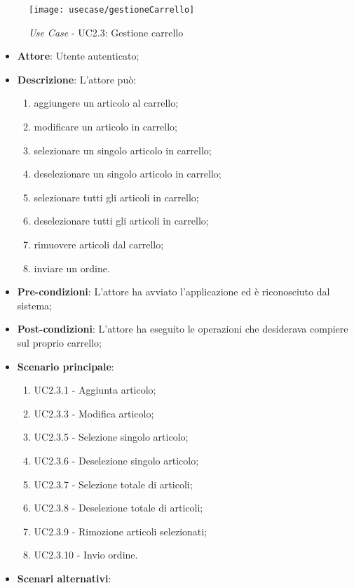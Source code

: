 \begin{figure}[!h] 
    \centering 
    \texttt{[image: usecase/gestioneCarrello]} 
    \caption{\textit{Use Case} - UC2.3: Gestione carrello}
\end{figure}

\begin{itemize}
	\item \textbf{Attore}: Utente autenticato;
	\item \textbf{Descrizione}: L'attore può:
		\begin{enumerate}
			\item aggiungere un articolo al carrello;
			\item modificare un articolo in carrello;
			\item selezionare un singolo articolo in carrello;
			\item deselezionare un singolo articolo in carrello;
			\item selezionare tutti gli articoli in carrello;
			\item deselezionare tutti gli articoli in carrello;
			\item rimuovere articoli dal carrello;
			\item inviare un ordine.
		\end{enumerate}
	\item \textbf{Pre-condizioni}: L'attore ha avviato l'applicazione ed è riconosciuto dal sistema;
	\item \textbf{Post-condizioni}: L'attore ha eseguito le operazioni che desiderava compiere sul proprio carrello;
	\item \textbf{Scenario principale}:
		\begin{enumerate}
			\item UC2.3.1 - Aggiunta articolo;
			\item UC2.3.3 - Modifica articolo;
			\item UC2.3.5 - Selezione singolo articolo;
			\item UC2.3.6 - Deselezione singolo articolo;
			\item UC2.3.7 - Selezione totale di articoli;
			\item UC2.3.8 - Deselezione totale di articoli;
			\item UC2.3.9 - Rimozione articoli selezionati;
			\item UC2.3.10 - Invio ordine.
		\end{enumerate}
	\item \textbf{Scenari alternativi}:
		\begin{itemize}

\end{itemize}
\end{itemize}
